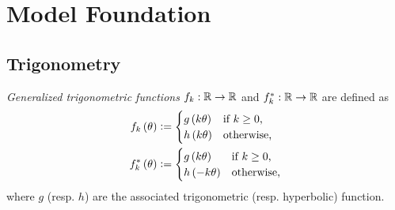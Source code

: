 \documentclass[stu, babel, american, biblatex, a4paper, leqno, draftall]{apa7}
\begin{document}
\section{Model Foundation}
\subsection{Trigonometry}
\begin{definition}\label{M:Trigonometry}
    \textit{Generalized trigonometric functions} $f_k:\mathbb{R}\to\mathbb{R}$ and $f_k^\ast:\mathbb{R}\to\mathbb{R}$ are defined as
    \begin{align*}
        f_k\left(\theta\right) & \vcentcolon=
        \begin{cases}
            g\left(k\theta\right) & \text{if $k\geq0$,} \\
            h\left(k\theta\right) & \text{otherwise,}   \\
        \end{cases} \\
        f_k^\ast\left(\theta\right) & \vcentcolon=
        \begin{cases}
            g\left(k\theta\right) & \text{if $k\geq0$,} \\
            h\left(-k\theta\right) & \text{otherwise,}   \\
        \end{cases}
    \end{align*}
    where $g$ (resp. $h$) are the associated trigonometric (resp. hyperbolic) function.
\end{definition}
\end{document}
